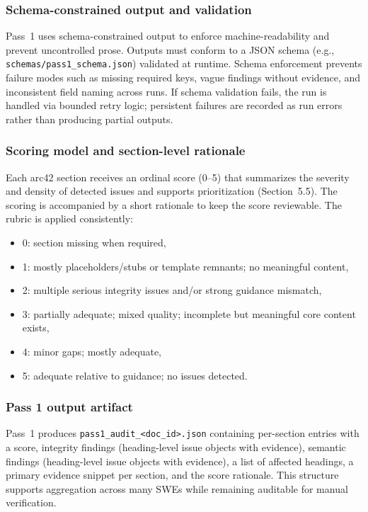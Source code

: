 \subsubsection{Schema-constrained output and validation}
Pass~1 uses schema-constrained output to enforce machine-readability and prevent uncontrolled prose. Outputs must conform to a JSON schema (e.g., \texttt{schemas/pass1\_schema.json}) validated at runtime. Schema enforcement prevents failure modes such as missing required keys, vague findings without evidence, and inconsistent field naming across runs. If schema validation fails, the run is handled via bounded retry logic; persistent failures are recorded as run errors rather than producing partial outputs.

\subsubsection{Scoring model and section-level rationale}
Each arc42 section receives an ordinal score (0--5) that summarizes the severity and density of detected issues and supports prioritization (Section~5.5). The scoring is accompanied by a short rationale to keep the score reviewable. The rubric is applied consistently:
\begin{itemize}
    \item 0: section missing when required,
    \item 1: mostly placeholders/stubs or template remnants; no meaningful content,
    \item 2: multiple serious integrity issues and/or strong guidance mismatch,
    \item 3: partially adequate; mixed quality; incomplete but meaningful core content exists,
    \item 4: minor gaps; mostly adequate,
    \item 5: adequate relative to guidance; no issues detected.
\end{itemize}

\subsubsection{Pass 1 output artifact}
Pass~1 produces \texttt{pass1\_audit\_\textless doc\_id\textgreater.json} containing per-section entries with a score, integrity findings (heading-level issue objects with evidence), semantic findings (heading-level issue objects with evidence), a list of affected headings, a primary evidence snippet per section, and the score rationale. This structure supports aggregation across many SWEs while remaining auditable for manual verification.

